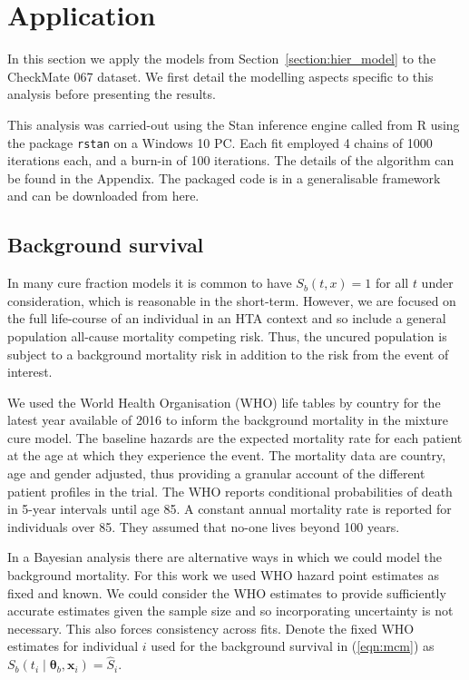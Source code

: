 \documentclass[AMA,STIX1COL]{WileyNJD-v2}
\begin{document}
%
\section{Application}\label{sec:application}
In this section we apply the models from Section~\ref{section:hier_model} to the CheckMate 067 dataset.
We first detail the modelling aspects specific to this analysis before presenting the results.

This analysis was carried-out using the Stan inference engine \cite{carpenter2017stan} called from R \cite{Rcoreteam} using the package \texttt{rstan} on a Windows 10 PC.
Each fit employed 4 chains of 1000 iterations each, and a burn-in of 100 iterations.
The details of the algorithm can be found in the Appendix.
The packaged code is in a generalisable framework and can be downloaded from here.

%
\subsection{Background survival}
In many cure fraction models it is common to have $S_b(t, x) = 1$ for all $t$ under consideration, which is reasonable in the short-term.
However, we are focused on the full life-course of an individual in an HTA context and so include a general population all-cause mortality competing risk.
Thus, the uncured population is subject to a background mortality risk in addition to the risk from the event of interest.

We used the World Health Organisation (WHO) life tables by country for the latest year available of 2016
\cite{wholifetables} to inform the background mortality in the mixture cure model.
The baseline hazards are the expected mortality rate for each patient at the age at which they experience the event.
The mortality data are country, age and gender adjusted, thus providing a granular account of
the different patient profiles in the trial.
The WHO reports conditional probabilities of death in 5-year intervals until age 85.
A constant annual mortality rate is reported for individuals over 85. They assumed that no-one lives beyond 100 years.

In a Bayesian analysis there are alternative ways in which we could model the background mortality.
For this work we used WHO hazard point estimates as fixed and known.
We could consider the WHO estimates to provide sufficiently accurate estimates
given the sample size and so incorporating uncertainty is not necessary. This also forces consistency across fits.
Denote the fixed WHO estimates for individual $i$ used for the background survival in (\ref{eqn:mcm}) as
$S_b(t_i \mid \bm\theta_b, \bm{x}_i) = \hat{S}_i$.
\end{document}
